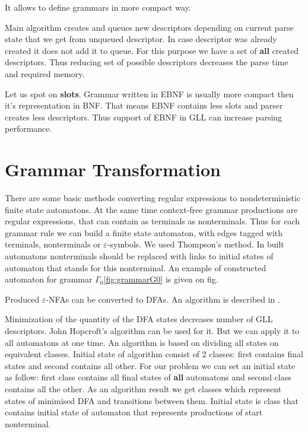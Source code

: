 \documentclass[runningheads,a4paper]{llncs}
\begin{document}
It allows to define grammars in more compact way.

Main algorithm creates and queues new descriptors depending on current parse state that we get from unqueued descriptor. 
In case descriptor was already created it does not add it to queue. For this purpose we have a set of
\textbf{all} created descriptors. Thus reducing set of possible descriptors decreases the parse time
and required memory.

Let us spot on \textbf{slots}. Grammar written in EBNF is usually more compact then it's representation in BNF. That means EBNF contains 
less slots and parser creates less descriptors. Thus support of EBNF in GLL can increase parsing performance. 

\section{Grammar Transformation}%

There are some basic methods converting regular expressions to nondeterministic finite state automatons. 
At the same time context-free grammar productions are regular expressions, that can contain as terminals 
as nonterminals. Thus for each grammar rule we can build a finite state automaton, with edges tagged with 
terminals, nonterminals or $\varepsilon$-symbols. We used Thompson's method\cite{Thompson:1968:PTR:363347.363387}. 
In built automatons nonterminals should be replaced with links to initial states of automaton that stands 
for this nonterminal. An example of constructed automaton for grammar $\Gamma_{0}$\ref{fig:grammarG0} is given on fig.

Produced $\varepsilon$-NFAs can be converted to DFAs. An algorithm is described in \cite{aho1974design}.

Minimization of the quantity of the DFA states decreases number of GLL descriptors. John Hopcroft's 
algorithm\cite{hopcroft1971n} can be used for it. But we can apply it to all automatons at one time. 
An algorithm is based on dividing all states on equivalent classes. Initial state of algorithm consist 
of 2 classes: first contains final states and second contains all other. For our problem we can set an 
initial state as follow: first class contains all final states of \textbf{all} automatons and second class 
contains all the other. As an algorithm result we get classes which represent states of minimised DFA and 
transitions between them.
Initial state is class that contains initial state of automaton that represents productions of start nonterminal.
\end{document}
